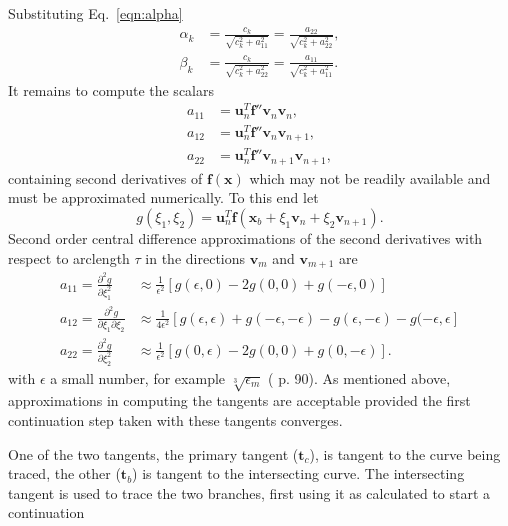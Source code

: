 \documentclass[10pt,openany,twoside]{book}
\numberwithin{equation}{section}   %
\newcommand{\Vector}[1]{\boldsymbol{#1}}
\newcommand{\Eqn}[1]{Eq.\ \ref{#1}}
\begin{document}
Substituting \Eqn{eqn:alpha}
\begin{align*}
\alpha_k &= \frac{c_k}{\sqrt{c_k^2 + a_{11}^2}} = \frac{a_{22}}{\sqrt{c_k^2 + a_{22}^2}}, \nonumber \\
\beta_k &=  \frac{c_k}{\sqrt{c_k^2 + a_{22}^2}} = \frac{a_{11}}{\sqrt{c_k^2 + a_{11}^2}}.
\end{align*}
It remains to compute the scalars
\begin{align*}
 a_{11} &= \Vector{u}_n^T\Vector{f}''\Vector{v}_n\Vector{v}_n, \nonumber \\
 a_{12} &= \Vector{u}_n^T\Vector{f}''\Vector{v}_n\Vector{v}_{n+1}, \nonumber \\
 a_{22} &= \Vector{u}_n^T\Vector{f}''\Vector{v}_{n+1}\Vector{v}_{n+1},
\end{align*}
containing
second derivatives of $\Vector{f}(\Vector{x})$ which may not be
readily available and must be approximated numerically.
To this end let
\begin{equation*}
g(\xi_1,\xi_2) = \Vector{u}_n^T\Vector{f}(\Vector{x}_b
	+ \xi_1 \Vector{v}_n + \xi_2 \Vector{v}_{n+1}).
\end{equation*}
Second order central difference approximations of the second
derivatives with respect to arclength $\tau$ in the directions
$\Vector{v}_m$ and $\Vector{v}_{m+1}$ are
\begin{align*}
a_{11} = \frac{\partial^2g}{\partial \xi_1^2}
	&\approx \frac{1}{\epsilon^2} \left[ g(\epsilon,0)
	- 2g(0,0) + g(-\epsilon,0) \right] \nonumber \\
a_{12} = \frac{\partial^2g}{\partial \xi_1 \partial \xi_2}
	&\approx \frac{1}{4\epsilon^2} \left[ g(\epsilon,\epsilon)
	+ g(-\epsilon,-\epsilon) - g(\epsilon,-\epsilon)
	- g(-\epsilon,\epsilon \right] \nonumber \\
a_{22} = \frac{\partial^2g}{\partial \xi_2^2} &\approx
	\frac{1}{\epsilon^2} \left[ g(0,\epsilon) - 2g(0,0) + g(0,-\epsilon) \right].
\end{align*}
with $\epsilon$ a small number, for example $\sqrt[3]{\epsilon_m}$
(\cite{allgower1990numerical} p. 90).
As mentioned above, approximations in computing the tangents
are acceptable provided the first continuation step taken with
these tangents converges.
\par
One of the two tangents, the primary tangent ($\Vector{t}_c$),
is tangent to the curve being traced, the other ($\Vector{t}_b$) is tangent
to the intersecting curve. The intersecting tangent is used to trace
the two branches, first using it as calculated to start a continuation
\end{document}
